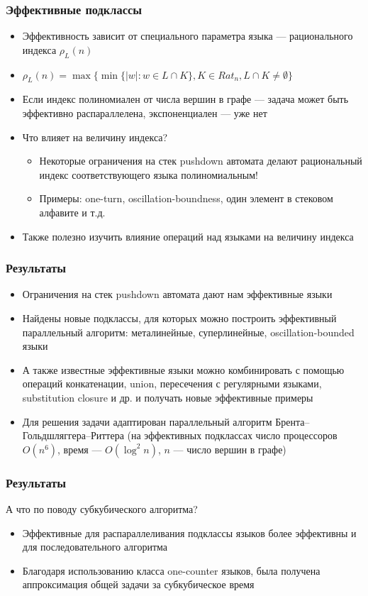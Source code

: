 \documentclass{beamer}
\begin{document}
\begin{frame}
\frametitle{Эффективные подклассы}
\begin{itemize}
\item Эффективность зависит от специального параметра языка --- рационального индекса  $\rho_L(n)$
\item $\rho_L(n) = \max\{\min\{|w|:w \in L \cap K\}, K \in {Rat}_n, L \cap K \neq \emptyset\}$
\item Если индекс полиномиален от числа вершин в графе --- задача может быть эффективно распараллелена, экспоненциален --- уже нет
\item Что влияет на величину индекса?
\begin{itemize}
\item Некоторые ограничения на стек pushdown автомата делают рациональный индекс соответствующего языка полиномиальным!
\item Примеры: one-turn, oscillation-boundness, один элемент в стековом алфавите и т.д.
\end{itemize}
\item Также полезно изучить влияние операций над языками на величину индекса
\end{itemize}
\end{frame}

\begin{frame}
\frametitle{Результаты}
\begin{itemize}
\item Ограничения на стек  pushdown автомата дают нам эффективные языки
\item Найдены новые подклассы, для которых можно построить эффективный параллельный алгоритм: металинейные, суперлинейные, oscillation-bounded языки
\item А также известные эффективные языки можно комбинировать с помощью операций конкатенации, union, пересечения с регулярными языками, substitution closure и др. и получать новые эффективные примеры
\item Для решения задачи адаптирован параллельный алгоритм Брента--Гольдшляггера--Риттера  (на эффективных подклассах число процессоров $O(n^6)$, время --- $O(\log^2 n)$, $n$ --- число вершин в графе)
\end{itemize}
\end{frame}

\begin{frame}
\frametitle{Результаты}
А что по поводу субкубического алгоритма?
\begin{itemize}
\item Эффективные для распараллеливания подклассы языков более эффективны и для последовательного алгоритма
\item Благодаря использованию класса one-counter языков, была получена аппроксимация общей задачи за субкубическое время
\end{itemize}
\end{frame}
\end{document}
